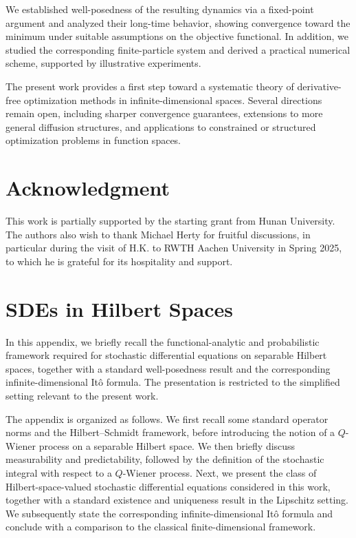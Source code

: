 \documentclass[12pt]{amsart}
\numberwithin{equation}{section}
\begin{document}
We established well-posedness of the resulting dynamics via a fixed-point argument and analyzed their long-time behavior, showing convergence toward the minimum under suitable assumptions on the objective functional. In addition, we studied the corresponding finite-particle system and derived a practical numerical scheme, supported by illustrative experiments.

The present work provides a first step toward a systematic theory of derivative-free optimization methods in infinite-dimensional spaces. Several directions remain open, including sharper convergence guarantees, extensions to more general diffusion structures, and applications to constrained or structured optimization problems in function spaces.

\section*{Acknowledgment}

This work is partially supported by the starting grant from Hunan University. 
The authors also wish to thank Michael Herty for fruitful discussions, in particular during the visit of H.K. to RWTH Aachen University in Spring 2025, to which he is grateful for its hospitality and support. 


\appendix



\section{SDEs in Hilbert Spaces}\label{app:sde in H}

In this appendix, we briefly recall the functional-analytic and probabilistic framework required for stochastic differential equations on separable Hilbert spaces, together with a standard well-posedness result and the corresponding infinite-dimensional It\^o formula. The presentation is restricted to the simplified setting relevant to the present work.

The appendix is organized as follows. We first recall some standard operator norms and the Hilbert--Schmidt framework, before introducing the notion of a $Q$-Wiener process on a separable Hilbert space. We then briefly discuss measurability and predictability, followed by the definition of the stochastic integral with respect to a $Q$-Wiener process. Next, we present the class of Hilbert-space-valued stochastic differential equations considered in this work, together with a standard existence and uniqueness result in the Lipschitz setting. We subsequently state the corresponding infinite-dimensional It\^o formula and conclude with a comparison to the classical finite-dimensional framework.
\end{document}
